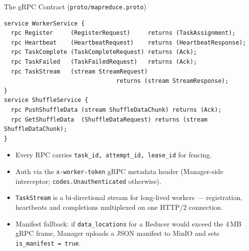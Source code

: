 \documentclass[11pt]{beamer}
\begin{document}
\begin{frame}[fragile]{The gRPC Contract (\texttt{proto/mapreduce.proto})}
\begin{lstlisting}
service WorkerService {
  rpc Register     (RegisterRequest)     returns (TaskAssignment);
  rpc Heartbeat    (HeartbeatRequest)    returns (HeartbeatResponse);
  rpc TaskComplete (TaskCompleteRequest) returns (Ack);
  rpc TaskFailed   (TaskFailedRequest)   returns (Ack);
  rpc TaskStream   (stream StreamRequest)
                                returns (stream StreamResponse);
}
service ShuffleService {
  rpc PushShuffleData (stream ShuffleDataChunk) returns (Ack);
  rpc GetShuffleData  (ShuffleDataRequest) returns (stream ShuffleDataChunk);
}
\end{lstlisting}

\scriptsize
\begin{itemize}
  \item Every RPC carries \texttt{task\_id, attempt\_id, lease\_id} for fencing.
  \item Auth via the \texttt{x-worker-token} gRPC metadata header (Manager-side interceptor;
        \texttt{codes.Unauthenticated} otherwise).
  \item \texttt{TaskStream} is a bi-directional stream for long-lived workers ---
        registration, heartbeats and completions multiplexed on \alert{one HTTP/2 connection}.
  \item \alert{Manifest fallback}: if \texttt{data\_locations} for a Reducer would exceed
        the 4\,MB gRPC frame, Manager uploads a JSON manifest to MinIO and sets
        \texttt{is\_manifest = true}.
\end{itemize}
\end{frame}
\end{document}
